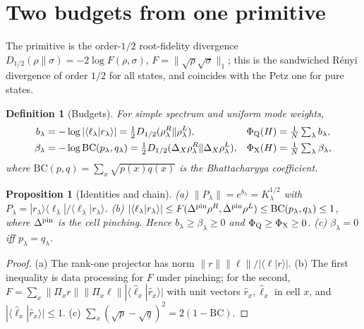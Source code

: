 \documentclass[11pt]{article}
\newtheorem{definition}{Definition}
\newtheorem{proposition}{Proposition}
\newcommand{\PhiQ}{\Phi_{\rm Q}}
\newcommand{\PhiX}{\Phi_{\rm X}}
\newcommand{\BC}{\mathrm{BC}}
\newcommand{\ip}[2]{\langle #1|#2\rangle}
\begin{document}
\section{Two budgets from one primitive}
The primitive is the order-$1/2$ root-fidelity divergence $D_{1/2}(\rho\|\sigma)=-2\log F(\rho,\sigma)$, $F=\|\sqrt\rho\sqrt\sigma\|_1$; this is the sandwiched R\'enyi divergence of order $1/2$ for all states, and coincides with the Petz one for pure states.
\begin{definition}[Budgets]
For simple spectrum and uniform mode weights,
\begin{align}
b_\lambda&=-\log|\ip{\ell_\lambda}{r_\lambda}|=\tfrac12D_{1/2}(\rho^R_\lambda\|\rho^L_\lambda), &
\PhiQ(H)&=\tfrac1N\textstyle\sum_\lambda b_\lambda,\\
\beta_\lambda&=-\log\BC(p_\lambda,q_\lambda)=\tfrac12D_{1/2}(\Delta_X\rho^R_\lambda\|\Delta_X\rho^L_\lambda), &
\PhiX(H)&=\tfrac1N\textstyle\sum_\lambda \beta_\lambda,
\end{align}
where $\BC(p,q)=\sum_x\sqrt{p(x)q(x)}$ is the Bhattacharyya coefficient.
\end{definition}

\begin{proposition}[Identities and chain]\label{prop:chain}
(a) $\|P_\lambda\|=e^{b_\lambda}=K_\lambda^{1/2}$ with $P_\lambda=|r_\lambda\rangle\langle\ell_\lambda|/\ip{\ell_\lambda}{r_\lambda}$.
(b) $|\ip{\ell_\lambda}{r_\lambda}|\le F(\Delta^{\rm pin}\rho^R,\Delta^{\rm pin}\rho^L)\le\BC(p_\lambda,q_\lambda)\le1$, where $\Delta^{\rm pin}$ is the cell pinching. Hence $b_\lambda\ge\beta_\lambda\ge0$ and $\PhiQ\ge\PhiX\ge0$.
(c) $\beta_\lambda=0$ iff $p_\lambda=q_\lambda$.
\end{proposition}
\begin{proof}
(a) The rank-one projector has norm $\|r\|\|\ell\|/|\ip\ell r|$. (b) The first inequality is data processing for $F$ under pinching; for the second, $F=\sum_x\|\Pi_xr\|\|\Pi_x\ell\||\ip{\hat\ell_x}{\hat r_x}|$ with unit vectors $\hat r_x,\hat\ell_x$ in cell $x$, and $|\ip{\hat\ell_x}{\hat r_x}|\le1$. (c) $\sum_x(\sqrt p-\sqrt q)^2=2(1-\BC)$.
\end{proof}
\end{document}

